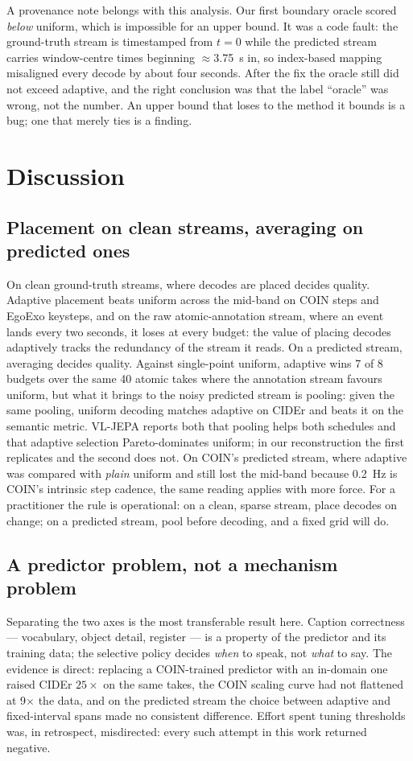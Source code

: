 \documentclass[journal]{IEEEtran}
\begin{document}
A provenance note belongs with this analysis. Our first boundary oracle scored
\emph{below} uniform, which is impossible for an upper bound. It was a code fault:
the ground-truth stream is timestamped from $t=0$ while the predicted stream
carries window-centre times beginning $\approx$3.75~s in, so index-based mapping
misaligned every decode by about four seconds. After the fix the oracle still did
not exceed adaptive, and the right conclusion was that the label ``oracle'' was
wrong, not the number. An upper bound that loses to the method it bounds is a bug;
one that merely ties is a finding.

\section{Discussion}

\subsection{Placement on clean streams, averaging on predicted ones}
On clean ground-truth streams, where decodes are placed decides quality. Adaptive
placement beats uniform across the mid-band on COIN steps and EgoExo keysteps, and
on the raw atomic-annotation stream, where an event lands every two seconds, it
loses at every budget: the value of placing decodes adaptively tracks the
redundancy of the stream it reads. On a predicted stream, averaging decides
quality. Against single-point uniform, adaptive wins 7 of 8 budgets over the same
40 atomic takes where the annotation stream favours uniform, but what it brings to
the noisy predicted stream is pooling: given the same pooling, uniform decoding
matches adaptive on CIDEr and beats it on the semantic metric. VL-JEPA reports both
that pooling helps both schedules and that adaptive selection Pareto-dominates
uniform; in our reconstruction the first replicates and the second does not. On
COIN's predicted stream, where adaptive was compared with \emph{plain} uniform and
still lost the mid-band because 0.2~Hz is COIN's intrinsic step cadence, the same
reading applies with more force. For a practitioner the rule is operational: on a
clean, sparse stream, place decodes on change; on a predicted stream, pool before
decoding, and a fixed grid will do.

\subsection{A predictor problem, not a mechanism problem}
Separating the two axes is the most transferable result here. Caption correctness
--- vocabulary, object detail, register --- is a property of the predictor and its
training data; the selective policy decides \emph{when} to speak, not \emph{what}
to say. The evidence is direct: replacing a COIN-trained predictor with an
in-domain one raised CIDEr $25\times$ on the same takes, the COIN scaling curve had
not flattened at 9$\times$ the data, and on the predicted stream the choice between
adaptive and fixed-interval spans made no consistent difference. Effort spent
tuning thresholds was, in retrospect, misdirected: every such attempt in this work
returned negative.
\end{document}
